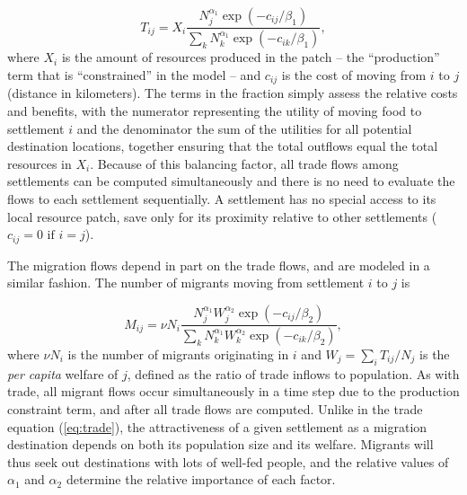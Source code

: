 \documentclass{article}
\begin{document}
\begin{equation}
    T_{ij} =  X_i  \frac{N_j^{\alpha_1} \exp\left(-c_{ij} / \beta_1 \right)}{ \sum_k N_k ^ {\alpha_1} \exp \left( -c_{ik} / \beta_1 \right)},
    \label{eq:trade}
\end{equation}
where $X_i$ is the amount of resources produced in the patch -- the ``production'' term that is ``constrained'' in the model -- and $c_{ij}$ is the cost of moving from $i$ to $j$ (distance in kilometers). The terms in the fraction simply assess the relative costs and benefits, with the numerator representing the utility of moving food to settlement $i$ and the denominator the sum of the utilities for all potential destination locations, together ensuring that the total outflows equal the total resources in $X_i$. Because of this balancing factor, all trade flows among settlements can be computed simultaneously and there is no need to evaluate the flows to each settlement sequentially. A settlement has no special access to its local resource patch, save only for its proximity relative to other settlements ($c_{ij} = 0 \text{ if } i = j$).

The migration flows depend in part on the trade flows, and are modeled in a similar fashion. The number of migrants moving from settlement $i$ to $j$ is 

\begin{equation}
  M_{ij} =  \nu N_i \frac{N_j^{\alpha_1} W_j^{\alpha_2} \exp\left(-c_{ij} / \beta_2 \right)}{ \sum_k N_k^{\alpha_1}  W_k^{\alpha_2} \exp \left( -c_{ik} / \beta_2 \right)},
  \label{eq:migration}
\end{equation}
where $\nu N_i$ is the number of migrants originating in $i$ and $W_j = \sum_iT_{ij}/N_j$ is the \emph{per capita} welfare of $j$, defined as the ratio of trade inflows to population. As with trade, all migrant flows occur simultaneously in a time step due to the production constraint term, and after all trade flows are computed. Unlike in the trade equation (\ref{eq:trade}), the attractiveness of a given settlement as a migration destination depends on both its population size and its welfare. Migrants will thus seek out destinations with lots of well-fed people, and the relative values of $\alpha_1$ and $\alpha_2$ determine the relative importance of each factor.
\end{document}
